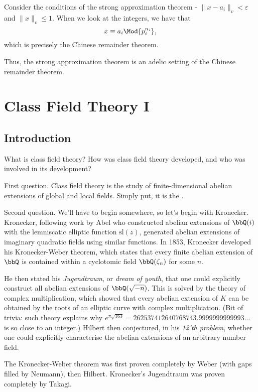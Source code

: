 \documentclass[a4paper, 12pt,oneside,openany]{book}
\begin{document}
Consider the conditions of the strong approximation theorem - $\|x-a_i\|_v < \varepsilon$ and $\|x\|_v \leq 1$. When we look at the integers, we have that $$x \equiv a_i \Mod{p_i^{n_i}},$$ which is precisely the Chinese remainder theorem. 

Thus, the strong approximation theorem is an adelic setting of the Chinese remainder theorem. 

\chapter{Class Field Theory I}
\minitoc

\section{Introduction}

What is class field theory? How was class field theory developed, and who was involved in its development?

First question. Class field theory is the study of finite-dimensional abelian extensions of global and local fields. Simply put, it is the . 

Second question. We'll have to begin somewhere, so let's begin with Kronecker. Kronecker, following work by Abel who constructed abelian extensions of $\bbQ(i)$ with the lemniscatic elliptic function $\text{sl}(z)$, generated abelian extensions of imaginary quadratic fields using similar functions. In 1853, Kronecker developed his Kronecker-Weber theorem, which states that every finite abelian extension of $\bbQ$ is contained within a cyclotomic field $\bbQ(\zeta_n)$ for some $n$. 

He then stated his \emph{Jugendtraum}, or \emph{dream of youth}, that one could explicitly construct all abelian extensions of $\bbQ(\sqrt{-n})$. This is solved by the theory of complex multiplication, which showed that every abelian extension of $K$ can be obtained by the roots of an elliptic curve with complex multiplication. (Bit of trivia: such theory explains why $e^{\pi\sqrt{163}}=262537412640768743.9999999999993\dots$ is so close to an integer.) Hilbert then conjectured, in his \emph{12'th problem}, whether one could explicitly characterise the abelian extensions of an arbitrary number field. 

The Kronecker-Weber theorem was first proven completely by Weber (with gaps filled by Neumann), then Hilbert. Kronecker's Jugendtraum was proven completely by Takagi.
\end{document}
